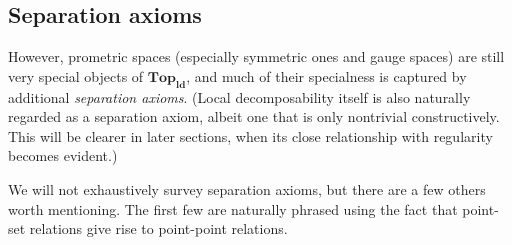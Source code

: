 \documentclass{article}
\def\oapt{\mathrel{\!\not\,\not\lesssim}}
\def\leapx{\lesssim}
\def\ldTop{\mathbf{Top}_{\mathbf{ld}}}
\begin{document}
\subsection{Separation axioms}
\label{sec:separation}

However, prometric spaces (especially symmetric ones and gauge spaces) are still very special objects of $\ldTop$, and much of their specialness is captured by additional \emph{separation axioms}.
(Local decomposability itself is also naturally regarded as a separation axiom, albeit one that is only nontrivial constructively.
This will be clearer in later sections, when its close relationship with regularity becomes evident.)

We will not exhaustively survey separation axioms, but there are a few others worth mentioning.
The first few are naturally phrased using the fact that point-set relations give rise to point-point relations.

\end{document}
